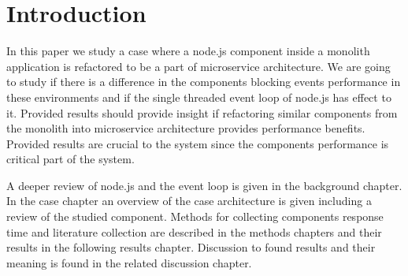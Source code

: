 \chapter{Introduction\label{intro}}

In this paper we study a case where a node.js component inside a monolith application is refactored to be a part of microservice architecture.
We are going to study if there is a difference in the components blocking events performance in these environments and if the single threaded event loop of node.js has effect to it.
Provided results should provide insight if refactoring similar components from the monolith into microservice architecture provides performance benefits.
Provided results are crucial to the system since the components performance is critical part of the system.

A deeper review of node.js and the event loop is given in the background chapter.
In the case chapter an overview of the case architecture is given including a review of the studied component.
Methods for collecting components response time and literature collection are described in the methods chapters and their results in the following results chapter.
Discussion to found results and their meaning is found in the related discussion chapter.


